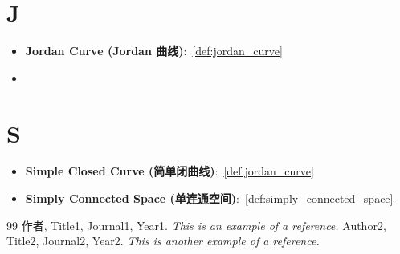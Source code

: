 \documentclass[11pt]{../../TexTemplate/elegantbook} %
\begin{document}
\section{J} %
\begin{itemize}
    \item \textbf{Jordan Curve (Jordan 曲线)}:~\ref{def:jordan_curve} 
    \item 
\end{itemize}

\section{S} %
\begin{itemize}
    \item \textbf{Simple Closed Curve (简单闭曲线)}:~\ref{def:jordan_curve}
    \item \textbf{Simply Connected Space (单连通空间)}:~\ref{def:simply_connected_space}
\end{itemize}


\begin{thebibliography}{99} 
 作者, Title1, Journal1, Year1. \emph{ This is an example of a reference.}
 Author2, Title2, Journal2, Year2. \emph{ This is another example of a reference.}
\end{thebibliography}
\end{document}

